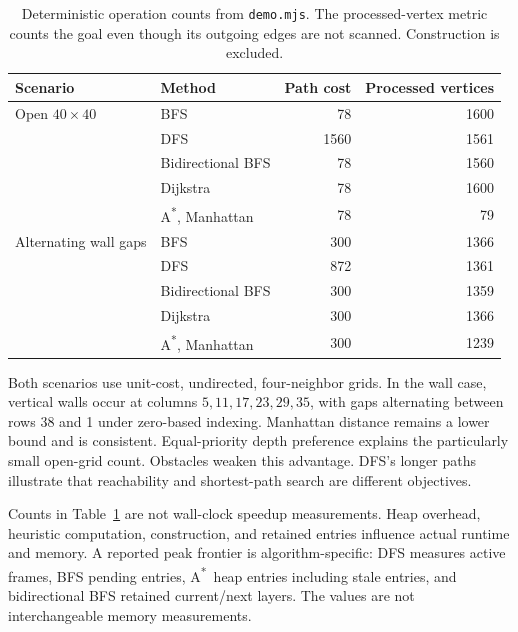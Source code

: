 \documentclass[11pt,a4paper]{article}
\newcommand{\astar}{A\textsuperscript{*}}
\begin{document}
\begin{table}[htbp]
\centering\small
\begin{tabular}{@{}llrr@{}}
\toprule
Scenario & Method & Path cost & Processed vertices\\
\midrule
Open $40\times40$ & BFS & 78 & 1600\\
 & DFS & 1560 & 1561\\
 & Bidirectional BFS & 78 & 1560\\
 & Dijkstra & 78 & 1600\\
 & \astar, Manhattan & 78 & 79\\
\midrule
Alternating wall gaps & BFS & 300 & 1366\\
 & DFS & 872 & 1361\\
 & Bidirectional BFS & 300 & 1359\\
 & Dijkstra & 300 & 1366\\
 & \astar, Manhattan & 300 & 1239\\
\bottomrule
\end{tabular}
\caption{Deterministic operation counts from \texttt{demo.mjs}. The processed-vertex metric counts the goal even though its outgoing edges are not scanned. Construction is excluded.}
\label{tab:results}
\end{table}

Both scenarios use unit-cost, undirected, four-neighbor grids. In the wall case, vertical walls occur at columns $5,11,17,23,29,35$, with gaps alternating between rows 38 and 1 under zero-based indexing. Manhattan distance remains a lower bound and is consistent. Equal-priority depth preference explains the particularly small open-grid count. Obstacles weaken this advantage. DFS's longer paths illustrate that reachability and shortest-path search are different objectives.

Counts in Table~\ref{tab:results} are not wall-clock speedup measurements. Heap overhead, heuristic computation, construction, and retained entries influence actual runtime and memory. A reported peak frontier is algorithm-specific: DFS measures active frames, BFS pending entries, \astar\ heap entries including stale entries, and bidirectional BFS retained current/next layers. The values are not interchangeable memory measurements.
\end{document}
